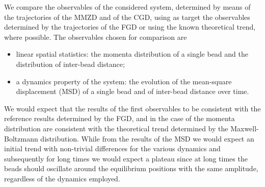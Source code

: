 \documentclass[10pt,a4paper]{book}
\theoremstyle{definition}
\begin{document}
We compare the observables of the considered system, determined by means of the trajectories of the MMZD and of the CGD, using as target the observables determined by the trajectories of the FGD or using the known theoretical trend, where possible. 
The observables chosen for comparison are
\begin{itemize}
\item[-] linear spatial statistics: the momenta distribution of a single bead and the distribution of inter-bead distance;
\item[-] a dynamics property of the system: the evolution of the mean-square displacement (MSD) of a single bead and of inter-bead distance over time.
\end{itemize}
We would expect that the results of the first observables to be consistent with the reference results determined by the FGD, and in the case of the momenta distribution are consistent with the theoretical trend determined by the Maxwell-Boltzmann distribution. 
While from the results of the MSD we would expect an initial trend with non-trivial differences for the various dynamics and subsequently for long times we would expect a plateau since at long times the beads should oscillate around the equilibrium positions with the same amplitude, regardless of the dynamics employed.
\end{document}
